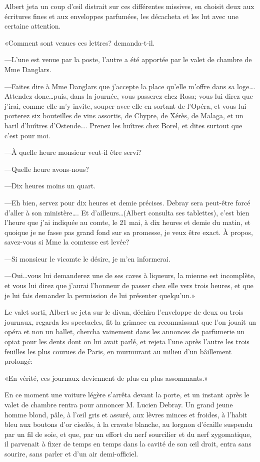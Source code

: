 Albert jeta un coup d'œil distrait sur ces différentes missives, en choisit deux aux écritures fines et aux enveloppes parfumées, les décacheta et les lut avec une certaine attention. 

«Comment sont venues ces lettres? demanda-t-il. 

—L'une est venue par la poste, l'autre a été apportée par le valet de chambre de Mme Danglars. 

—Faites dire à Mme Danglars que j'accepte la place qu'elle m'offre dans sa loge\dots. Attendez donc\dots puis, dans la journée, vous passerez chez Rosa; vous lui direz que j'irai, comme elle m'y invite, souper avec elle en sortant de l'Opéra, et vous lui porterez six bouteilles de vins assortis, de Chypre, de Xérès, de Malaga, et un baril d'huîtres d'Ostende\dots. Prenez les huîtres chez Borel, et dites surtout que c'est pour moi. 

—À quelle heure monsieur veut-il être servi? 

—Quelle heure avons-nous? 

—Dix heures moins un quart. 

—Eh bien, servez pour dix heures et demie précises. Debray sera peut-être forcé d'aller à son ministère\dots. Et d'ailleurs\dots (Albert consulta ses tablettes), c'est bien l'heure que j'ai indiquée au comte, le 21 mai, à dix heures et demie du matin, et quoique je ne fasse pas grand fond sur sa promesse, je veux être exact. À propos, savez-vous si Mme la comtesse est levée? 

—Si monsieur le vicomte le désire, je m'en informerai. 

—Oui\dots vous lui demanderez une de ses caves à liqueurs, la mienne est incomplète, et vous lui direz que j'aurai l'honneur de passer chez elle vers trois heures, et que je lui fais demander la permission de lui présenter quelqu'un.» 

Le valet sorti, Albert se jeta sur le divan, déchira l'enveloppe de deux ou trois journaux, regarda les spectacles, fit la grimace en reconnaissant que l'on jouait un opéra et non un ballet, chercha vainement dans les annonces de parfumerie un opiat pour les dents dont on lui avait parlé, et rejeta l'une après l'autre les trois feuilles les plus courues de Paris, en murmurant au milieu d'un bâillement prolongé: 

«En vérité, ces journaux deviennent de plus en plus assommants.» 

En ce moment une voiture légère s'arrêta devant la porte, et un instant après le valet de chambre rentra pour annoncer M. Lucien Debray. Un grand jeune homme blond, pâle, à l'œil gris et assuré, aux lèvres minces et froides, à l'habit bleu aux boutons d'or ciselés, à la cravate blanche, au lorgnon d'écaille suspendu par un fil de soie, et que, par un effort du nerf sourcilier et du nerf zygomatique, il parvenait à fixer de temps en temps dans la cavité de son œil droit, entra sans sourire, sans parler et d'un air demi-officiel. 

